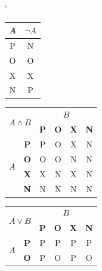 \documentclass[a4paper, 11pt]{article}
\begin{document}
\begin{table}[h]
	\centering
	\catcode`
	\begin{tabular}{|c|c|}
		\hline
		\multicolumn{1}{|c|}{\textit{A}} & $\neg A$ \\
		\hline
		P                                & N        \\
		\hline
		O                                & O        \\
		\hline
		X                                & X        \\
		\hline
		N                                & P        \\
		\hline
	\end{tabular}
	\begin{tabular}{|c|c|c|c|c|c|}
		\hline
		\multicolumn{2}{|c|}{\multirow{2}{*}{$A \land B$}} & \multicolumn{4}{c|}{$B$}                                            \\ \cline{3-6}
		\multicolumn{2}{|c|}{}                             & \textbf{P}               & \textbf{O} & \textbf{X} & \textbf{N}     \\ \hline
		\multirow{4}{*}{$A$}                               & \textbf{P}               & P          & O          & X          & N \\ \cline{2-6}
		                                                   & \textbf{O}               & O          & O          & N          & N \\ \cline{2-6}
		                                                   & \textbf{X}               & X          & N          & X          & N \\ \cline{2-6}
		                                                   & \textbf{N}               & N          & N          & N          & N \\ \hline
	\end{tabular}
	\begin{tabular}{|c|c|c|c|c|c|}
		\hline
		\multicolumn{2}{|c|}{\multirow{2}{*}{$A \lor B$}} & \multicolumn{4}{c|}{$B$}                                            \\ \cline{3-6}
		\multicolumn{2}{|c|}{}                            & \textbf{P}               & \textbf{O} & \textbf{X} & \textbf{N}     \\ \hline
		\multirow{4}{*}{$A$}                              & \textbf{P}               & P          & P          & P          & P \\ \cline{2-6}
		                                                  & \textbf{O}               & P          & O          & P          & O \\ \cline{2-6}

\end{tabular}
\end{table}
\end{document}
